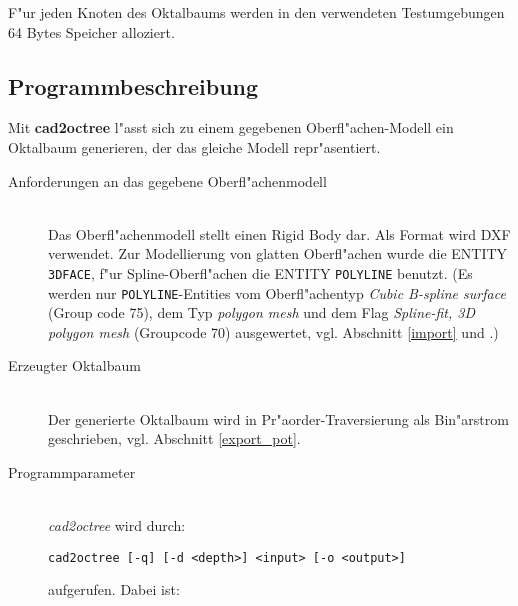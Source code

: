 F"ur jeden Knoten des Oktalbaums werden in den verwendeten Testumgebungen 
64 Bytes Speicher alloziert.

\subsection{Programmbeschreibung} 
\label{prg_descr}
Mit \textbf{cad2octree} l"asst sich zu einem gegebenen Oberfl"achen-Modell 
ein Oktalbaum generieren, der das gleiche Modell repr"asentiert.

\begin{description}
\item[Anforderungen an das gegebene Oberfl"achenmodell]\label{%
    oberflmodel_anf}~\\
    Das Oberfl"achenmodell stellt einen Rigid Body dar. Als Format wird DXF 
    verwendet. Zur Modellierung von glatten Oberfl"achen wurde die ENTITY 
    \texttt{3DFACE}, f"ur Spline-Oberfl"achen die ENTITY \texttt{POLYLINE} 
    benutzt. (Es werden nur \texttt{POLYLINE}-Entities vom Oberfl"achentyp 
    \emph{Cubic B-spline surface} (Group code 75), dem Typ 
    \emph{polygon mesh} und dem Flag \emph{Spline-fit, 3D polygon mesh} 
    (Groupcode 70) ausgewertet, vgl. Abschnitt \ref{import} und 
    \cite[S. 62, 97]{dxf_ref}.) 
\item[Erzeugter Oktalbaum]~\\ 
    Der generierte Oktalbaum wird in Pr"aorder-Traversierung als Bin"arstrom 
    geschrieben, vgl. Abschnitt \ref{export_pot}.
\item[Programmparameter]~\\ 
    \emph{cad2octree} wird durch: 

    \texttt{cad2octree [-q] [-d <depth>] <input> [-o <output>]}

    aufgerufen. Dabei ist: 


\end{description}
